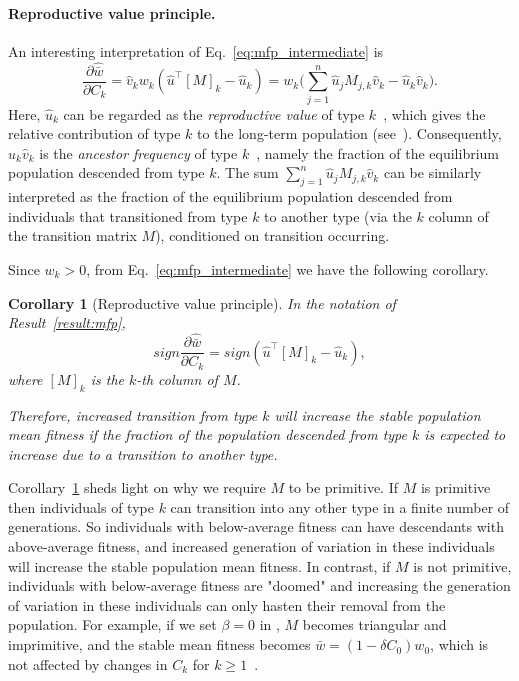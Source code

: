 \documentclass[9pt, a4paper, twocolumn]{extarticle}
\newcommand*{\tr}{^\intercal}
\newtheorem{corollary}{Corollary}
\begin{document}
\paragraph*{Reproductive value principle.}

An interesting interpretation of Eq.~\ref{eq:mfp_intermediate} is
\begin{equation}
\frac{\partial \hat{\bar w}}{\partial C_k} = 
\hat v_k w_k (\hat u\tr[M]_k - \hat u_k) = 
w_k \Big(\sum_{j=1}^{n}{\hat u_j M_{j,k} \hat v_k} - \hat u_k \hat v_k\Big).
\end{equation}
Here, $\hat u_k$ can be regarded as the \emph{reproductive value} of type $k$~\citep[pg.~27]{Fisher1930}, which gives the relative contribution of type $k$ to the long-term population (see~).
Consequently, $\hat u_k \hat v_k$ is the \emph{ancestor frequency} of type $k$~\citep{Hermisson2002}, namely the fraction of the equilibrium population descended from type $k$.
The sum $\sum_{j=1}^{n}{\hat u_j M_{j,k} \hat v_k}$ can be similarly interpreted as the fraction of the equilibrium population descended from individuals that transitioned from type $k$ to another type (via the $k$ column of the transition matrix $M$), conditioned on transition occurring.

Since $w_k>0$, from Eq.~\ref{eq:mfp_intermediate} we have the following corollary.

\begin{corollary}[Reproductive value principle]\label{cor:rvp}
In the notation of Result~\ref{result:mfp},
\begin{equation}
sign \frac{\partial \hat{\bar w}}{\partial C_k} = 
sign (\hat u\tr [M]_k - \hat u_k),
\end{equation}
where $[M]_k$ is the $k$-th column of $M$.

Therefore, increased transition from type $k$ will increase the stable population mean fitness if the fraction of the population descended from type $k$ is expected to increase due to a transition to another type. 
\end{corollary}

Corollary~\ref{cor:rvp} sheds light on why we require $M$ to be primitive.
If $M$ is primitive then individuals of type $k$ can transition into any other type in a finite number of generations.
So individuals with below-average fitness can have descendants with above-average fitness, and increased generation of variation in these individuals will increase the stable population mean fitness.
In contrast, if $M$ is  not primitive, individuals with below-average fitness are "doomed" and increasing the generation of variation in these individuals can only hasten their removal from the population.
For example, if we set $\beta=0$ in , $M$ becomes triangular and imprimitive, and the stable mean fitness becomes $\bar{w} = (1-\delta C_0)w_0$, which is not affected by changes in $C_k$ for $k \ge 1$~\citep[see also][Fig.~1A]{Agrawal2002,Ram2012}.
\end{document}
